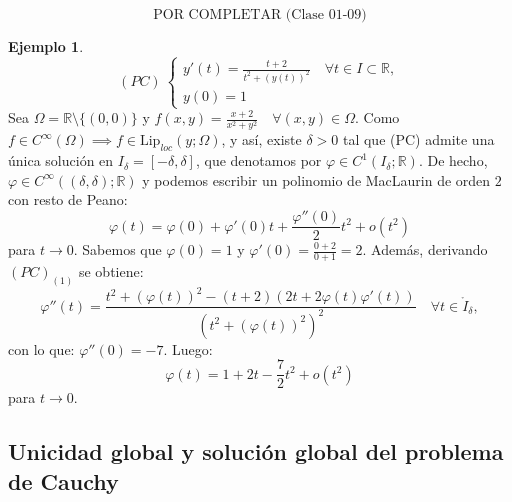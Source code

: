 \documentclass[11pt]{article}
\theoremstyle{definition} %
\newtheorem{example}[theorem]{Ejemplo}
\newcommand{\R}{\mathbb{R}}
\begin{document}
\[
  \text{POR COMPLETAR (Clase 01-09)}
\]

\begin{example}

	\[ (PC) \ \begin{cases}
		y'(t) = \frac{t+2}{t^2+(y(t))^2} \quad \forall t \in I \subset \R, \\
		y(0) = 1
	\end{cases} \]
	Sea $\Omega = \R \setminus \{(0,0)\}$ y $f(x,y) = \frac{x+2}{x^2 + y^2} \quad \forall (x,y) \in \Omega$. Como $f \in C^{\infty}(\Omega) \implies f \in \text{Lip}_{loc}(y;\Omega)$, y así, existe $\delta > 0$ tal que (PC) admite una única solución en $I_{\delta} = [-\delta,\delta]$, que denotamos por $\varphi \in C^{1}(I_{\delta};\R)$. De hecho, $\varphi \in C^{\infty}((\delta,\delta);\R)$ y podemos escribir un polinomio de MacLaurin de orden $2$ con resto de Peano:
	\[ \varphi(t) = \varphi(0) + \varphi'(0)t + \frac{\varphi''(0)}{2}t^2 + o(t^2) \]
	para $t \to 0$. Sabemos que $\varphi(0) = 1$ y $\varphi'(0) = \frac{0+2}{0+1}=2$. Además, derivando $(PC)_{(1)}$ se obtiene:
	\[ \varphi''(t) = \frac{t^2 + (\varphi(t))^2 - (t+2)(2t+2\varphi(t)\varphi'(t))}{(t^2 + (\varphi(t))^2)^2} \quad \forall t \in \mathring{I}_{\delta}, \]
	con lo que: $\varphi''(0) = -7$. Luego:
	\[ \varphi(t) = 1 + 2t - \frac{7}{2}t^2 + o(t^2) \]
	para $t \to 0$.
\end{example}

\subsection*{ Unicidad global y solución global del problema de Cauchy}
\end{document}

